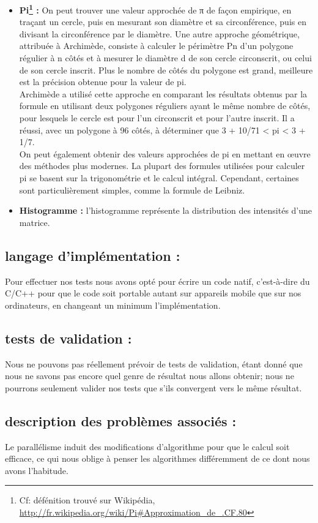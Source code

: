 \begin{itemize}
	\newpage
	\item{ \textbf{Pi\footnote{Cf: défénition trouvé sur Wikipédia, \url{http://fr.wikipedia.org/wiki/Pi#Approximation_de_.CF.80}} :} On peut trouver une valeur approchée de π de façon empirique, en traçant un cercle, puis en mesurant son diamètre et sa circonférence, puis en divisant la circonférence par le diamètre. Une autre approche géométrique, attribuée à Archimède, consiste à calculer le périmètre Pn d’un polygone régulier à n côtés et à mesurer le diamètre d de son cercle circonscrit, ou celui de son cercle inscrit. Plus le nombre de côtés du polygone est grand, meilleure est la précision obtenue pour la valeur de pi.\\
	Archimède a utilisé cette approche en comparant les résultats obtenus par la formule en utilisant deux polygones réguliers ayant le même nombre de côtés, pour lesquels le cercle est pour l’un circonscrit et pour l’autre inscrit. Il a réussi, avec un polygone à 96 côtés, à déterminer que 3 + 10/71 < pi < 3 + 1/7.\\
	On peut également obtenir des valeurs approchées de pi en mettant en œuvre des méthodes plus modernes. La plupart des formules utilisées pour calculer pi se basent sur la trigonométrie et le calcul intégral. Cependant, certaines sont particulièrement simples, comme la formule de Leibniz. \\}

	\item{ \textbf{Histogramme :} l’histogramme représente la distribution des intensités d'une matrice.}
	\end{itemize}

	\subsection*{langage d'implémentation :}
		Pour effectuer nos tests nous avons opté pour écrire un code natif, c'est-à-dire du C/C++ pour que le code soit portable autant sur appareils mobile que sur nos ordinateurs, en changeant un minimum l'implémentation. 

	\subsection*{tests de validation :}
		Nous ne pouvons pas réellement prévoir de tests de validation, étant donné que nous ne savons pas encore quel genre de résultat nous allons obtenir; nous ne pourrons seulement valider nos tests que s'ils convergent vers le même résultat. 

	\subsection*{description des problèmes associés :}
		Le parallélisme induit des modifications d'algorithme pour que le calcul soit efficace, ce qui nous oblige à penser les algorithmes différemment de ce dont nous avons l'habitude.